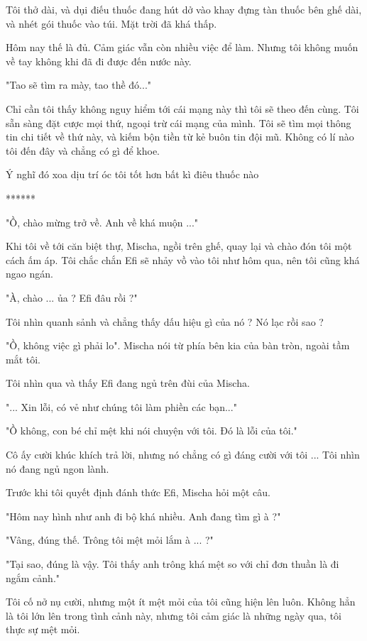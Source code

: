 Tôi thở dài, và dụi điếu thuốc đang hút dở vào khay đựng tàn thuốc bên ghế dài, và nhét gói thuốc vào túi. Mặt trời đã khá thấp.

Hôm nay thế là đủ. Cảm giác vẫn còn nhiều việc để làm. Nhưng tôi không muốn về tay không khi đã đi được đến nước này.

"Tao sẽ tìm ra mày, tao thề đó..."

Chỉ cần tôi thấy không nguy hiểm tới cái mạng này thì tôi sẽ theo đến cùng. Tôi sẵn sàng đặt cược mọi thứ, ngoại trừ cái mạng của mình. Tôi sẽ tìm mọi thông tin chi tiết về thứ này, và kiếm bộn tiền từ kẻ buôn tin đội mũ. Không có lí nào tôi đến đây và chẳng có gì để khoe.

Ý nghĩ đó xoa dịu trí óc tôi tốt hơn bất kì điêu thuốc nào \\

\begin{center}
	******
\end{center}
"Ồ, chào mừng trở về. Anh về khá muộn ..."

Khi tôi về tới căn biệt thự, Mischa, ngồi trên ghế, quay lại và chào đón tôi một cách ấm áp. Tôi chắc chắn Efi sẽ nhảy vồ vào tôi như hôm qua, nên tôi cũng khá ngao ngán.

"À, chào ... ủa ? Efi đâu rồi ?"

Tôi nhìn quanh sảnh và chẳng thấy dấu hiệu gì của nó ? Nó lạc rồi sao ?

"Ồ, không việc gì phải lo". Mischa nói từ phía bên kia của bàn tròn, ngoài tầm mắt tôi.

Tôi nhìn qua và thấy Efi đang ngủ trên đùi của Mischa.

"... Xin lỗi, có vẻ như chúng tôi làm phiền các bạn..."

"Ồ không, con bé chỉ mệt khi nói chuyện với tôi. Đó là lỗi của tôi."

Cô ấy cười khúc khích trả lời, nhưng nó chẳng có gì đáng cười với tôi ... Tôi nhìn nó đang ngủ ngon lành.

Trước khi tôi quyết định đánh thức Efi, Mischa hỏi một câu.

"Hôm nay hình như anh đi bộ khá nhiều. Anh đang tìm gì à ?"

"Vâng, đúng thế. Trông tôi mệt mỏi lắm à ... ?"

"Tại sao, đúng là vậy. Tôi thấy anh trông khá mệt so với chỉ đơn thuần là đi ngắm cảnh."

Tôi cố nở nụ cười, nhưng một ít mệt mỏi của tôi cũng hiện lên luôn. Không hẳn là tôi lớn lên trong tình cảnh này, nhưng tôi cảm giác là những ngày qua, tôi thực sự mệt mỏi.

